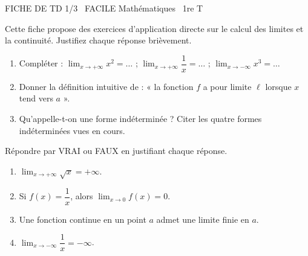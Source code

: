 \documentclass[11pt]{article}
\begin{document}
\begin{tcolorbox}[enhanced,colback=popink,colframe=popink,arc=10pt,boxrule=0pt,left=12pt,right=12pt,top=9pt,bottom=9pt]
{\color{white}\popxbold\small FICHE DE TD 1/3 \textbullet\ FACILE \hfill Mathématiques \textbullet\ 1re T\par}
\end{tcolorbox}
\vspace{4pt}
Cette fiche propose des exercices d'application directe sur le calcul des limites et la continuité. Justifiez chaque réponse brièvement.

\begin{exercice}
\begin{enumerate}
\item Compléter : $\displaystyle\lim_{x\to +\infty} x^2 = \ldots$ ; $\displaystyle\lim_{x\to +\infty} \dfrac{1}{x} = \ldots$ ; $\displaystyle\lim_{x\to -\infty} x^3 = \ldots$
\item Donner la définition intuitive de : « la fonction $f$ a pour limite $\ell$ lorsque $x$ tend vers $a$ ».
\item Qu'appelle-t-on une forme indéterminée ? Citer les quatre formes indéterminées vues en cours.
\end{enumerate}
\end{exercice}

\begin{exercice}
Répondre par VRAI ou FAUX en justifiant chaque réponse.
\begin{enumerate}
\item $\displaystyle\lim_{x\to +\infty} \sqrt{x} = +\infty$.
\item Si $f(x) = \dfrac{1}{x}$, alors $\displaystyle\lim_{x\to 0} f(x) = 0$.
\item Une fonction continue en un point $a$ admet une limite finie en $a$.
\item $\displaystyle\lim_{x\to -\infty} \dfrac{1}{x} = -\infty$.
\end{enumerate}
\end{exercice}
\end{document}

